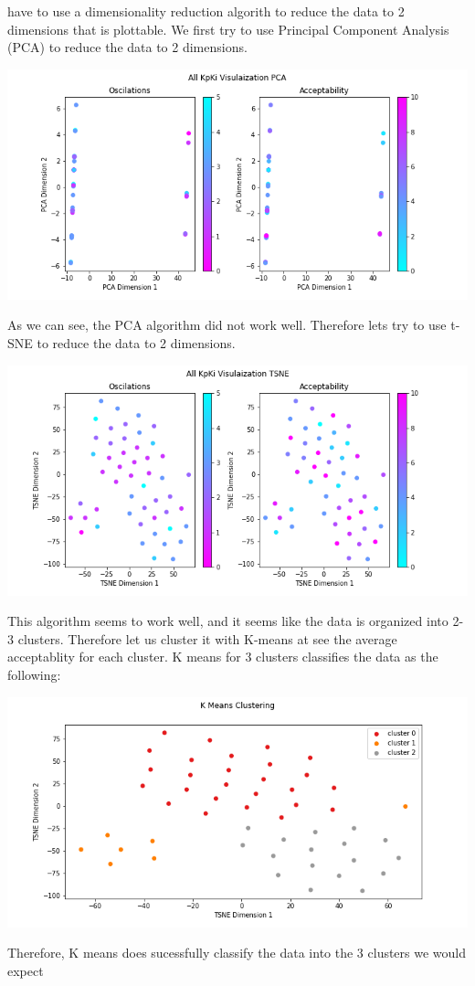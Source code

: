 \documentclass[12pt]{article}
\begin{document}
\begin{multicols}{2}
have to use a dimensionality reduction algorith to reduce the data to 2 dimensions that is plottable. We first try to use
Principal Component Analysis (PCA) to reduce the data to 2 dimensions.
\begin{center}
    \includegraphics*[scale=0.3]{KpKiAllPCA.png}
\end{center}
As we can see, the PCA algorithm did not work well. Therefore lets try to use t-SNE to reduce the data to 2 dimensions.
\begin{center}
    \includegraphics*[scale=0.3]{KpKiAllTSNE.png}
\end{center}
This algorithm seems to work well, and it seems like the data is organized into 2-3 clusters. Therefore let us cluster 
it with K-means at see the average acceptablity for each cluster. K means for 3 clusters classifies the data as the following:
\begin{center}
    \includegraphics*[scale=0.3]{KpKiAllTSNEKMeans.png}
\end{center}
Therefore, K means does sucessfully classify the data into the 3 clusters we would expect
\end{multicols}
\end{document}
